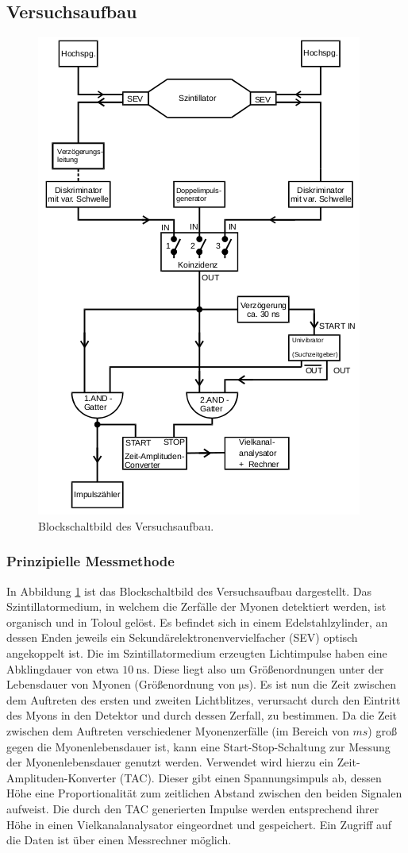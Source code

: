\subsection{Versuchsaufbau}
\label{sec:Versuchsaufbau}
\begin{figure}
  \centering
  \includegraphics[width=0.75\columnwidth]{pictures/aufbau.png}
  \caption{Blockschaltbild des Versuchsaufbau.\cite{Anleitung}}
  \label{fig:aufbau}
\end{figure}
\subsubsection{Prinzipielle Messmethode}
In Abbildung \ref{fig:aufbau} ist das Blockschaltbild des Versuchsaufbau dargestellt.
Das Szintillatormedium, in welchem die Zerfälle der Myonen detektiert werden, ist organisch und in Toloul gelöst. Es befindet sich in einem Edelstahlzylinder, an dessen Enden jeweils ein Sekundärelektronenvervielfacher (SEV) optisch angekoppelt ist.
Die im Szintillatormedium erzeugten Lichtimpulse haben eine Abklingdauer von etwa $\SI{10}{\nano\second}$. Diese liegt also um Größenordnungen unter der Lebensdauer von Myonen (Größenordnung von $\si{\micro\second}$).
Es ist nun die Zeit zwischen dem Auftreten des ersten und zweiten Lichtblitzes, verursacht durch den Eintritt des Myons in den Detektor und durch dessen Zerfall, zu bestimmen.
Da die Zeit zwischen dem Auftreten verschiedener Myonenzerfälle (im Bereich von $\si{ms}$) groß gegen die Myonenlebensdauer ist, kann eine Start-Stop-Schaltung zur Messung der Myonenlebensdauer genutzt werden.
Verwendet wird hierzu ein Zeit-Amplituden-Konverter (TAC). Dieser gibt einen Spannungsimpuls ab, dessen Höhe eine Proportionalität zum zeitlichen Abstand zwischen den beiden Signalen aufweist.
Die durch den TAC generierten Impulse werden entsprechend ihrer Höhe in einen Vielkanalanalysator eingeordnet und gespeichert. Ein Zugriff auf die Daten ist über einen Messrechner möglich.

